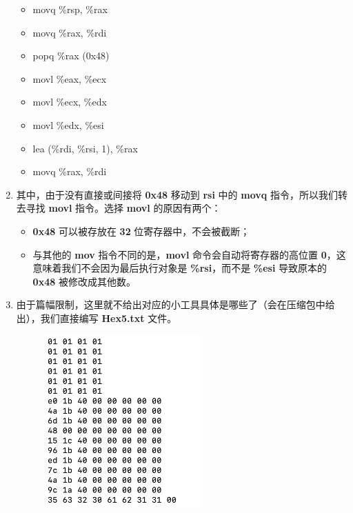 \begin{enumerate}
            \begin{itemize}
                \item movq \%rsp, \%rax
                \item movq \%rax, \%rdi
                \item popq \%rax (0x48)
                \item movl \%eax, \%ecx
                \item movl \%ecx, \%edx
                \item movl \%edx, \%esi
                \item lea (\%rdi, \%rsi, 1), \%rax
                \item movq \%rax, \%rdi
            \end{itemize}
            \item 其中，由于没有直接或间接将 \textbf{0x48} 移动到 \textbf{rsi} 中的 \textbf{movq} 指令，所以我们转去寻找 \textbf{movl} 指令。选择 \textbf{movl} 的原因有两个：
                \begin{itemize}
                    \item \textbf{0x48} 可以被存放在 \textbf{32} 位寄存器中，不会被截断；
                    \item 与其他的 \textbf{mov} 指令不同的是，\textbf{movl} 命令会自动将寄存器的高位置 \textbf{0}，这意味着我们不会因为最后执行对象是 \textbf{\%rsi}，而不是 \textbf{\%esi} 导致原本的 \textbf{0x48} 被修改成其他数。
                \end{itemize}
            \item 由于篇幅限制，这里就不给出对应的小工具具体是哪些了（会在压缩包中给出），我们直接编写 \textbf{Hex5.txt} 文件。
                \begin{figure}[htbp]
                    \hspace*{1.5cm}
                    \includegraphics*[width = 6cm]{s5_1.png}
                \end{figure}

\end{enumerate}
